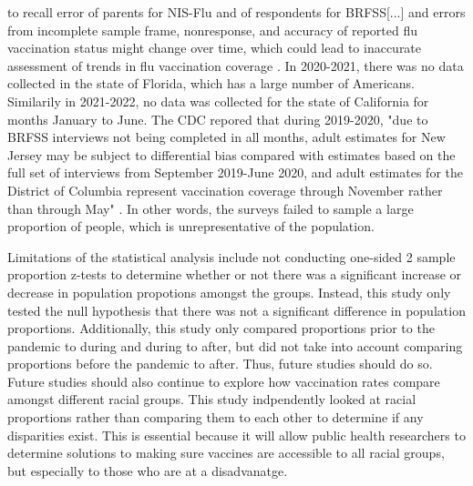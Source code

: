 \documentclass[12pt]{article}
\begin{document}
to recall error of parents for NIS-Flu and of respondents for BRFSS[...] and errors from incomplete sample frame, nonresponse, and accuracy of reported flu vaccination status might change over time, which could lead to inaccurate assessment of trends in flu 
vaccination coverage \citep{cdc_2021}. In 2020-2021, there was no data collected in the state of Florida, which has a large number of Americans. Similarily in 2021-2022, no data was collected for the state of California for months January to June. The CDC repored that
during 2019-2020, "due to BRFSS interviews not being completed in all months, adult estimates for New Jersey may be subject to differential bias compared with estimates based on the full set of interviews from September 2019-June 2020, and adult estimates for the District of Columbia 
represent vaccination coverage through November rather than through May" \citep{cdc_2021}. In other words, the surveys failed to sample a large proportion of people, which is unrepresentative of the population. \par
Limitations of the statistical analysis include not conducting one-sided 2 sample proportion z-tests to determine whether or not there was a significant increase or decrease in population propotions amongst the groups. Instead, this study only tested the null hypothesis that there was not a
significant difference in population proportions. Additionally, this study only compared proportions prior to the pandemic to during and during to after, but did not take into account comparing proportions before the pandemic to after. Thus, future studies should do so. Future studies should
also continue to explore how vaccination rates compare amongst different racial groups. This study indpendently looked at racial proportions rather than comparing them to each other to determine if any disparities exist. This is essential because it will allow public health researchers to determine
solutions to making sure vaccines are accessible to all racial groups, but especially to those who are at a disadvanatge. 
\clearpage


\end{document}
